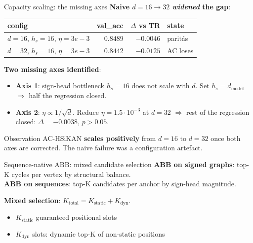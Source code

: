 \documentclass[aspectratio=169, 11pt]{beamer}
\begin{document}
\begin{frame}{Capacity scaling: the missing axes}
  \textbf{Naive $d=16 \to 32$ \emph{widened} the gap}:
  \\[1mm]
  \begin{center}\small
  \begin{tabular}{lrrl}
  \toprule
  config & val\_acc & $\Delta$ vs TR & state \\
  \midrule
  $d=16$, $h_s=16$, $\eta=3e{-}3$ & $0.8489$ & $-0.0046$ & paritás \\
  $d=32$, $h_s=16$, $\eta=3e{-}3$ & $0.8442$ & $-0.0125$ & AC loses\\
  \bottomrule
  \end{tabular}
  \end{center}

  \vspace{2mm}
  \textbf{Two missing axes identified}:
  \begin{itemize}
  \item \textbf{Axis 1}: sign-head bottleneck $h_s = 16$ does not scale
        with $d$. Set $h_s = d_{\text{model}}$ $\Rightarrow$ half the
        regression closed.
  \item \textbf{Axis 2}: $\eta \propto 1/\sqrt{d}$. Reduce
        $\eta = 1.5 \cdot 10^{-3}$ at $d=32$ $\Rightarrow$ rest of the
        regression closed: $\Delta = -0.0038$, $p > 0.05$.
  \end{itemize}

  \begin{block}{Observation}
  AC-HSiKAN \textbf{scales positively} from $d=16$ to $d=32$ once both
  axes are corrected. The naive failure was a configuration artefact.
  \end{block}
\end{frame}

\begin{frame}{Sequence-native ABB: mixed candidate selection}
  \textbf{ABB on signed graphs}: top-K cycles per vertex by structural
  balance. \\
  \textbf{ABB on sequences}: top-K candidates per anchor by sign-head
  magnitude.

  \vspace{2mm}
  \textbf{Mixed selection}: $K_{\text{total}} = K_{\text{static}} +
  K_{\text{dyn}}$.
  \begin{itemize}
  \item $K_{\text{static}}$ guaranteed positional slots
  \item $K_{\text{dyn}}$ slots: dynamic top-K of non-static positions
  \end{itemize}
  \centering
  \resizebox{0.7\textwidth}{!}{}
\end{frame}
\end{document}
